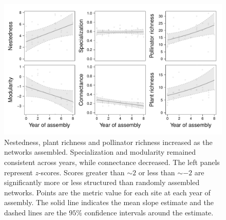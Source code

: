 \documentclass[12pt]{article}
\begin{document}
\begin{figure}
  \centering
  \includegraphics[width=1\textwidth]{../analysis/networkLevel/figures/baci.pdf}
  \caption{Nestedness, plant richness and pollinator richness
    increased as the networks assembled. Specialization and modularity
    remained consistent across years, while connectance decreased. The
    left panels represent $z$-scores. Scores greater than $\sim 2$ or
    less than $\sim -2$ are significantly more or less structured than
    randomly assembled networks. Points are the metric value for each
    site at each year of assembly. The solid line indicates the mean
    slope estimate and the dashed lines are the $95\%$ confidence
    intervals around the estimate.}
  \label{fig:baci}
\end{figure}
\clearpage
\end{document}
